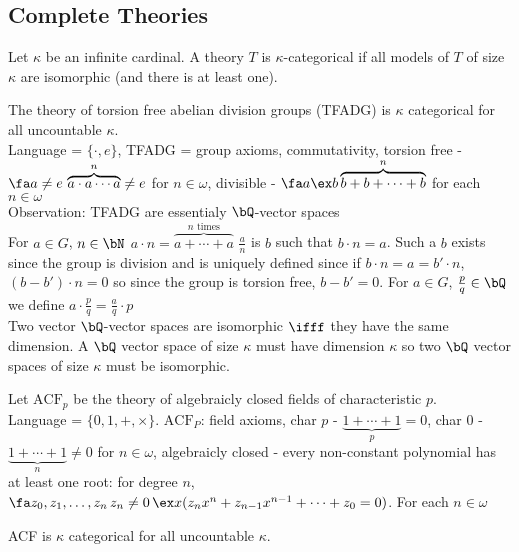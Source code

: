
\subsection{Complete Theories}

\begin{definition}
    Let $\kappa$ be an infinite cardinal. A theory $T$ is $\kappa$-categorical if all models of $T$ of size $\kappa$ are isomorphic (and there is at least one). 
\end{definition}

\begin{example}
    The theory of torsion free abelian division groups (TFADG) is $\kappa$ categorical for all uncountable $\kappa$. \\
    Language = $\{ \cdot, e \}$, TFADG = group axioms, commutativity, torsion free - $\fa a \neq e \, \overbrace{a \cdot a \cdots a}^{n}\neq e$ for $n \in \omega$, divisible - $\fa a \ex b \overbrace{b+ b+ \cdots +b}^{n}$ for each $n \in \omega$ \\
    Observation: TFADG are essentialy $\bQ$-vector spaces \\
    For $a \in G$, $n \in \bN$ $a \cdot n = \overbrace{a + \cdots + a}^{n \text{ times}}$ $\frac{a}{n}$ is $b$ such that $b \cdot n=a$. Such a $b$ exists since the group is division and is uniquely defined since if $b \cdot n = a = b' \cdot n$, $(b-b') \cdot n = 0$ so since the group is torsion free, $b-b'=0$. For $a \in G$, $\frac{p}{q} \in \bQ$ we define $a \cdot \frac{p}{q} = \frac{a}{q} \cdot p$ \\
    Two vector $\bQ$-vector spaces are isomorphic $\ifff$ they have the same dimension. A $\bQ$ vector space of size $\kappa$ must have dimension $\kappa$ so two $\bQ$ vector spaces of size $\kappa$ must be isomorphic. 
\end{example}

\noindent
Let $\text{ACF}_p$ be the theory of algebraicly closed fields of characteristic $p$. \\
Language = $\{0, 1, + , \times\}$. $\text{ACF}_P$: field axioms, char $p$ - $\underbrace{1 + \cdots + 1}_{p}=0$, char $0$ - $\underbrace{1 + \cdots + 1}_{n} \neq 0$ for $n \in \omega$, algebraicly closed - every non-constant polynomial has at least one root: for degree $n$, $\fa z_0, z_1, \ldots, z_n \, z_n \neq 0 \, \ex x (z_nx^n + z_{n-1}x^{n-1} + \cdots + z_0 = 0)$. For each $n \in \omega$ 

\begin{proposition}
    ACF is $\kappa$ categorical for all uncountable $\kappa$. 
\end{proposition}

